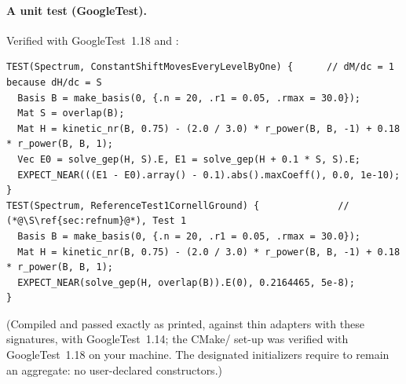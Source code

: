 \documentclass[11pt,a4paper]{article}
\numberwithin{equation}{section}
\theoremstyle{definition}
\theoremstyle{plain}
\theoremstyle{remark}
\numberwithin{algorithm}{section}
\begin{document}
\paragraph{A unit test (GoogleTest).} Verified with GoogleTest~1.18 and :
\begin{lstlisting}[style=cpp]
TEST(Spectrum, ConstantShiftMovesEveryLevelByOne) {      // dM/dc = 1 because dH/dc = S
  Basis B = make_basis(0, {.n = 20, .r1 = 0.05, .rmax = 30.0});
  Mat S = overlap(B);
  Mat H = kinetic_nr(B, 0.75) - (2.0 / 3.0) * r_power(B, B, -1) + 0.18 * r_power(B, B, 1);
  Vec E0 = solve_gep(H, S).E, E1 = solve_gep(H + 0.1 * S, S).E;
  EXPECT_NEAR(((E1 - E0).array() - 0.1).abs().maxCoeff(), 0.0, 1e-10);
}
TEST(Spectrum, ReferenceTest1CornellGround) {              // (*@\S\ref{sec:refnum}@*), Test 1
  Basis B = make_basis(0, {.n = 20, .r1 = 0.05, .rmax = 30.0});
  Mat H = kinetic_nr(B, 0.75) - (2.0 / 3.0) * r_power(B, B, -1) + 0.18 * r_power(B, B, 1);
  EXPECT_NEAR(solve_gep(H, overlap(B)).E(0), 0.2164465, 5e-8);
}
\end{lstlisting}
(Compiled and passed exactly as printed, against thin adapters with these signatures, with GoogleTest~1.14; the CMake/ set-up was verified with GoogleTest~1.18 on your machine. The designated initializers  require  to remain an aggregate: no user-declared constructors.)
\end{document}
